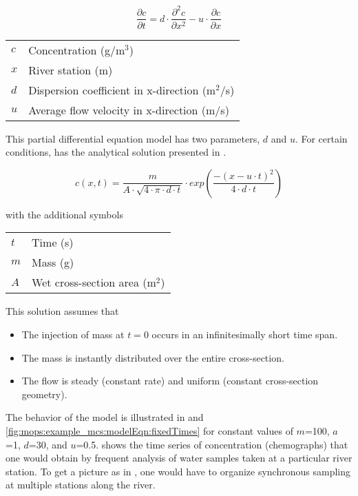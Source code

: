 \begin{equation} \label{eqn:mops:example_mcs:modelEqn:ade-pde}
\dfrac{\partial c}{\partial t} = d \cdot \dfrac{\partial^2 c}{\partial x^2} - u \cdot \dfrac{\partial c}{\partial x}
\end{equation}

\begin{tabular}{lp{}}
  $c$ & Concentration (g/m$^3$) \\
  $x$ & River station (m) \\
  $d$ & Dispersion coefficient in x-direction (m$^2$/s) \\
  $u$ & Average flow velocity in x-direction (m/s) \\
\end{tabular}

\medskip
This partial differential equation model has two parameters, $d$ and $u$. For certain conditions,  has the analytical solution presented in .

\begin{equation} \label{eqn:mops:example_mcs:modelEqn:ade-solution}
  c(x,t)= \frac{m}{A \cdot \sqrt{4 \cdot \pi \cdot d \cdot t}} \cdot exp\left(\frac{-(x-u \cdot t)^2}{4 \cdot d \cdot t} \right)
\end{equation}

with the additional symbols

\begin{tabular}{lp{}}
  $t$ & Time (s) \\
  $m$ & Mass (g) \\
  $A$ & Wet cross-section area (m$^2$) \\
\end{tabular}

\medskip
This solution assumes that
\begin{itemize}
  \item The injection of mass at $t=0$ occurs in an infinitesimally short time span.
  \item The mass is instantly distributed over the entire cross-section.
  \item The flow is steady (constant rate) and uniform (constant cross-section geometry).
\end{itemize}

The behavior of the model is illustrated in  and \ref{fig:mops:example_mcs:modelEqn:fixedTimes} for constant values of $m$=100, $a$=1, $d$=30, and $u$=0.5.  shows the time series of concentration (chemographs) that one would obtain by frequent analysis of water samples taken at a particular river station. To get a picture as in , one would have to organize synchronous sampling at multiple stations along the river.

